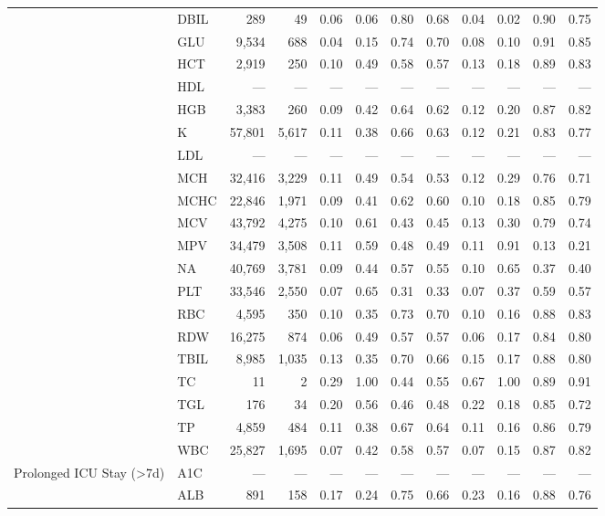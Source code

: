 \begin{table}[ht]
\begin{tabular}{llrrrrrrrrrr}
 & DBIL & 289 & 49 & 0.06 & 0.06 & 0.80 & 0.68 & 0.04 & 0.02 & 0.90 & 0.75 \\
 & GLU & 9,534 & 688 & 0.04 & 0.15 & 0.74 & 0.70 & 0.08 & 0.10 & 0.91 & 0.85 \\
 & HCT & 2,919 & 250 & 0.10 & 0.49 & 0.58 & 0.57 & 0.13 & 0.18 & 0.89 & 0.83 \\
 & HDL & --- & --- & --- & --- & --- & --- & --- & --- & --- & --- \\
 & HGB & 3,383 & 260 & 0.09 & 0.42 & 0.64 & 0.62 & 0.12 & 0.20 & 0.87 & 0.82 \\
 & K & 57,801 & 5,617 & 0.11 & 0.38 & 0.66 & 0.63 & 0.12 & 0.21 & 0.83 & 0.77 \\
 & LDL & --- & --- & --- & --- & --- & --- & --- & --- & --- & --- \\
 & MCH & 32,416 & 3,229 & 0.11 & 0.49 & 0.54 & 0.53 & 0.12 & 0.29 & 0.76 & 0.71 \\
 & MCHC & 22,846 & 1,971 & 0.09 & 0.41 & 0.62 & 0.60 & 0.10 & 0.18 & 0.85 & 0.79 \\
 & MCV & 43,792 & 4,275 & 0.10 & 0.61 & 0.43 & 0.45 & 0.13 & 0.30 & 0.79 & 0.74 \\
 & MPV & 34,479 & 3,508 & 0.11 & 0.59 & 0.48 & 0.49 & 0.11 & 0.91 & 0.13 & 0.21 \\
 & NA & 40,769 & 3,781 & 0.09 & 0.44 & 0.57 & 0.55 & 0.10 & 0.65 & 0.37 & 0.40 \\
 & PLT & 33,546 & 2,550 & 0.07 & 0.65 & 0.31 & 0.33 & 0.07 & 0.37 & 0.59 & 0.57 \\
 & RBC & 4,595 & 350 & 0.10 & 0.35 & 0.73 & 0.70 & 0.10 & 0.16 & 0.88 & 0.83 \\
 & RDW & 16,275 & 874 & 0.06 & 0.49 & 0.57 & 0.57 & 0.06 & 0.17 & 0.84 & 0.80 \\
 & TBIL & 8,985 & 1,035 & 0.13 & 0.35 & 0.70 & 0.66 & 0.15 & 0.17 & 0.88 & 0.80 \\
 & TC & 11 & 2 & 0.29 & 1.00 & 0.44 & 0.55 & 0.67 & 1.00 & 0.89 & 0.91 \\
 & TGL & 176 & 34 & 0.20 & 0.56 & 0.46 & 0.48 & 0.22 & 0.18 & 0.85 & 0.72 \\
 & TP & 4,859 & 484 & 0.11 & 0.38 & 0.67 & 0.64 & 0.11 & 0.16 & 0.86 & 0.79 \\
 & WBC & 25,827 & 1,695 & 0.07 & 0.42 & 0.58 & 0.57 & 0.07 & 0.15 & 0.87 & 0.82 \\
\midrule
Prolonged ICU Stay (>7d) & A1C & --- & --- & --- & --- & --- & --- & --- & --- & --- & --- \\
 & ALB & 891 & 158 & 0.17 & 0.24 & 0.75 & 0.66 & 0.23 & 0.16 & 0.88 & 0.76 \\

\end{tabular}
\end{table}
